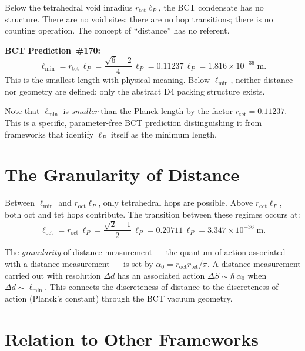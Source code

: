 \documentclass[aps,prl,twocolumn,showpacs,preprintnumbers]{revtex4-2}
\newcommand{\roct}{r_{\mathrm{oct}}}
\newcommand{\rtet}{r_{\mathrm{tet}}}
\newcommand{\azero}{\alpha_0}
\newcommand{\lP}{\ell_P}
\begin{document}
Below the tetrahedral void inradius $\rtet\lP$, the BCT condensate
has no structure. There are no void sites; there are no hop
transitions; there is no counting operation. The concept of
``distance'' has no referent.

\textbf{BCT Prediction~\#170:}
\begin{equation}
  \ell_{\min} = \rtet\,\lP
  = \frac{\sqrt{6}-2}{4}\,\lP
  = 0.11237\,\lP
  = 1.816\times10^{-36}\;\text{m}.
  \label{eq:lmin}
\end{equation}
This is the smallest length with physical meaning.
Below $\ell_{\min}$, neither distance nor geometry are defined;
only the abstract D4 packing structure exists.

Note that $\ell_{\min}$ is \emph{smaller} than the Planck length
by the factor $\rtet = 0.11237$. This is a specific, parameter-free
BCT prediction distinguishing it from frameworks that identify
$\lP$ itself as the minimum length.

\section{The Granularity of Distance}

Between $\ell_{\min}$ and $\roct\lP$, only tetrahedral hops are
possible. Above $\roct\lP$, both oct and tet hops contribute.
The transition between these regimes occurs at:
\begin{equation}
  \ell_{\mathrm{oct}} = \roct\,\lP
  = \frac{\sqrt{2}-1}{2}\,\lP
  = 0.20711\,\lP
  = 3.347\times10^{-36}\;\text{m}.
  \label{eq:loct}
\end{equation}

The \emph{granularity} of distance measurement --- the quantum
of action associated with a distance measurement --- is set by
$\azero = \roct\rtet/\pi$. A distance measurement carried out
with resolution $\Delta d$ has an associated action
$\Delta S \sim \hbar\,\azero$ when $\Delta d \sim \ell_{\min}$.
This connects the discreteness of distance to the discreteness
of action (Planck's constant) through the BCT vacuum geometry.

\section{Relation to Other Frameworks}
\end{document}
